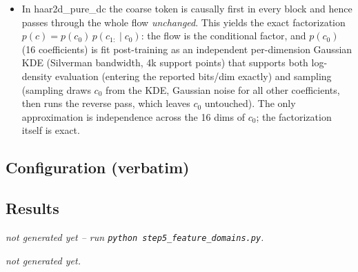 \documentclass[11pt]{article}
\begin{document}
\begin{itemize}
        \textbf{haar2d\_alt} $[I,H,F,H{\circ}F]$ and \textbf{dct2d\_alt}
        $[I,D,F,D{\circ}F]$ (alternate pixel- and coefficient-domain
        blocks); \textbf{haar2d\_flip} / \textbf{dct2d\_flip} (all blocks in
        the coefficient domain, AR direction alternating);
        \textbf{haar2d\_pure\_dc} $[H,H,H,H]$ with NO flips.
  \item In haar2d\_pure\_dc the coarse token is causally first in every
        block and hence passes through the whole flow \emph{unchanged}. This
        yields the exact factorization $p(c) = p(c_0)\,p(c_{1:}\mid c_0)$:
        the flow is the conditional factor, and $p(c_0)$ (16 coefficients)
        is fit post-training as an independent per-dimension Gaussian KDE
        (Silverman bandwidth, 4k support points) that supports both
        log-density evaluation (entering the reported bits/dim exactly) and
        sampling (sampling draws $c_0$ from the KDE, Gaussian noise for all
        other coefficients, then runs the reverse pass, which leaves $c_0$
        untouched). The only approximation is independence across the 16
        dims of $c_0$; the factorization itself is exact.
\end{itemize}

\subsection{Configuration (verbatim)}
{\small}

\subsection{Results}
\begin{center}
  {\emph{not generated yet -- run \texttt{python step5\_feature\_domains.py}.}}
\end{center}

  {\emph{not generated yet.}}
\clearpage
\end{document}
